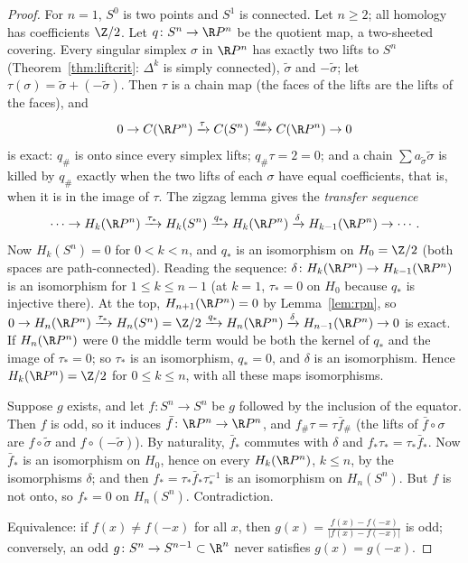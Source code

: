 \begin{proof}
For $n=1$, $S^0$ is two points and $S^1$ is connected. Let $n\ge2$; all homology has coefficients $\Z/2$. Let $q\colon S^n\to\R P^n$ be the quotient map, a two-sheeted covering. Every singular simplex $\sigma$ in
$\R P^n$ has exactly two lifts to $S^n$ (Theorem~\ref{thm:liftcrit}: $\Delta^k$ is simply connected), $\tilde\sigma$ and $-\tilde\sigma$; let $\tau(\sigma)=\tilde\sigma+(-\tilde\sigma)$. Then $\tau$ is a chain map (the faces of the lifts are the lifts of the faces),
and
\[0\to C(\R P^n)\xrightarrow{\tau}C(S^n)\xrightarrow{q_\#}C(\R P^n)\to0\]
is exact: $q_\#$ is onto since every simplex lifts; $q_\#\tau=2=0$; and a chain $\sum a_{\tilde\sigma}\tilde\sigma$ is killed by $q_\#$ exactly when the two lifts of each $\sigma$ have equal coefficients, that is, when it is in the
image of $\tau$. The zigzag lemma gives the \emph{transfer sequence}
\[\cdots\to H_k(\R P^n)\xrightarrow{\tau_*}H_k(S^n)\xrightarrow{q_*}H_k(\R P^n)\xrightarrow{\delta}H_{k-1}(\R P^n)\to\cdots.\]
Now $H_k(S^n)=0$ for $0<k<n$, and $q_*$ is an isomorphism on $H_0=\Z/2$ (both spaces are path-connected). Reading the sequence: $\delta\colon H_k(\R P^n)\to H_{k-1}(\R P^n)$ is an isomorphism for
$1\le k\le n-1$ (at $k=1$, $\tau_*=0$ on $H_0$ because $q_*$ is injective there). At the top, $H_{n+1}(\R P^n)=0$ by Lemma~\ref{lem:rpn}, so $0\to H_n(\R P^n)\xrightarrow{\tau_*}H_n(S^n)=\Z/2\xrightarrow{q_*}H_n(\R P^n)\xrightarrow\delta H_{n-1}(\R P^n)\to0$
is exact. If $H_n(\R P^n)$ were $0$ the middle term would be both the kernel of $q_*$ and the image of $\tau_*=0$; so $\tau_*$ is an isomorphism, $q_*=0$, and $\delta$ is an isomorphism. Hence
$H_k(\R P^n)=\Z/2$ for $0\le k\le n$, with all these maps isomorphisms.

Suppose $g$ exists, and let $f\colon S^n\to S^n$ be $g$ followed by the inclusion of the equator. Then $f$ is odd, so it induces $\bar f\colon\R P^n\to\R P^n$, and $f_\#\tau=\tau\bar f_\#$ (the lifts of $\bar f\circ\sigma$ are
$f\circ\tilde\sigma$ and $f\circ(-\tilde\sigma)$). By naturality, $\bar f_*$ commutes with $\delta$ and $f_*\tau_*=\tau_*\bar f_*$. Now $\bar f_*$ is an isomorphism on $H_0$, hence on every $H_k(\R P^n)$, $k\le n$, by the isomorphisms
$\delta$; and then $f_*=\tau_*\bar f_*\tau_*^{-1}$ is an isomorphism on $H_n(S^n)$. But $f$ is not onto, so $f_*=0$ on $H_n(S^n)$. Contradiction.

Equivalence: if $f(x)\ne f(-x)$ for all $x$, then $g(x)=\frac{f(x)-f(-x)}{|f(x)-f(-x)|}$ is odd; conversely, an odd $g\colon S^n\to S^{n-1}\subset\R^n$ never satisfies $g(x)=g(-x)$.
\end{proof}

